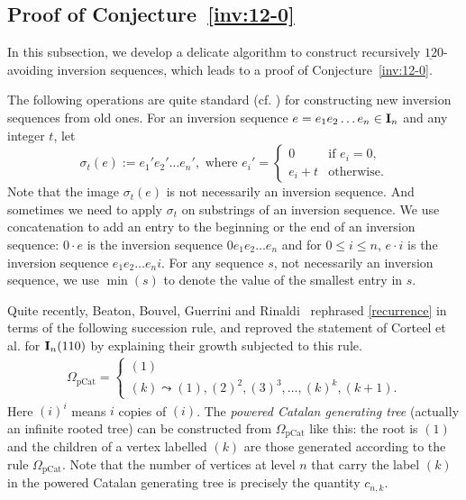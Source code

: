 \documentclass[12pt,A4]{amsart}
\numberwithin{equation}{section}
\theoremstyle{plain}
\theoremstyle{definition}
\def\I{\operatorname{{\bf I}}}
\begin{document}
\subsection{Proof of Conjecture~\ref{inv:12-0}}
In this subsection, we develop a delicate algorithm to construct recursively $\underline{12}0$-avoiding inversion  sequences, which leads to a proof of Conjecture~\ref{inv:12-0}. 

The following operations are quite standard (cf. \cite{cor}) for constructing new inversion sequences from old ones.
For an inversion sequence $e=e_1e_2\ldots e_n\in\I_n$ and any integer $t$, let $$\sigma_t(e):=e_1'e_2'\ldots e_n', \text{ where }e_i'=\begin{cases}0 & \text{if $e_i=0$},\\
e_i+t & \text{otherwise}.\end{cases}$$
Note that the image $\sigma_t(e)$ is not necessarily an inversion sequence. And sometimes we need to apply $\sigma_t$ on substrings of an inversion sequence.
We use concatenation to add an entry to the beginning or the end of an inversion sequence: $0\cdot e$ is the inversion sequence $0e_1e_2\ldots e_n$ and for $0\le i\le n$, $e\cdot i$ is the inversion sequence $e_1e_2\ldots e_n i$. For any sequence $s$, not necessarily an inversion sequence, we use $\min(s)$ to denote the value of the smallest entry in $s$.


Quite recently, Beaton, Bouvel, Guerrini and Rinaldi~\cite[Prop.~19]{bbgr} rephrased \eqref{recurrence} in terms of the following succession rule, and reproved the statement of Corteel et al. for $\I_n(110)$ by explaining their growth subjected to this rule. 
\begin{align}\label{rule}
\Omega_{\mathrm{pCat}}=\begin{cases}
(1) \\
(k) \leadsto (1), (2)^2, (3)^3,\ldots,(k)^k,(k+1).
\end{cases}
\end{align}
Here $(i)^i$ means $i$ copies of $(i)$.
The {\em powered Catalan generating tree} (actually an infinite rooted tree) can be constructed from $\Omega_{\mathrm{pCat}}$ like this: the root is $(1)$ and the children of a vertex labelled $(k)$ are those generated according to the rule $\Omega_{\mathrm{pCat}}$. Note that the number of vertices  at level $n$ that carry the label $(k)$  in the powered Catalan generating tree is precisely the quantity $c_{n,k}$.  
\end{document}
